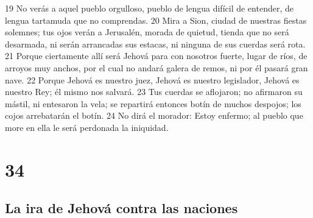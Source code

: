 19 No verás a aquel pueblo orgulloso, pueblo de lengua difícil de entender, de lengua tartamuda que no comprendas.
20 Mira a Sion, ciudad de nuestras fiestas solemnes; tus ojos verán a Jerusalén, morada de quietud, tienda que no será desarmada, ni serán arrancadas sus estacas, ni ninguna de sus cuerdas será rota. 
21 Porque ciertamente allí será Jehová para con nosotros fuerte, lugar de ríos, de arroyos muy anchos, por el cual no andará galera de remos, ni por él pasará gran nave.
22 Porque Jehová es nuestro juez, Jehová es nuestro legislador, Jehová es nuestro Rey; él mismo nos salvará.
23 Tus cuerdas se aflojaron; no afirmaron su mástil, ni entesaron la vela; se repartirá entonces botín de muchos despojos; los cojos arrebatarán el botín.
24 No dirá el morador: Estoy enfermo; al pueblo que more en ella le será perdonada la iniquidad.


\chapter{34}

\section*{La ira de Jehová contra las naciones}

